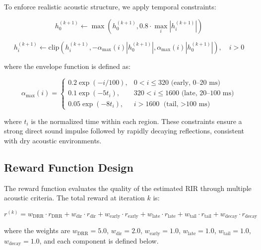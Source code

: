 To enforce realistic acoustic structure, we apply temporal constraints:

\begin{equation}
h_0^{(k+1)} \leftarrow \max(h_0^{(k+1)}, 0.8 \cdot \max_i |h_i^{(k+1)}|)
\label{eq:direct_constraint}
\end{equation}

\begin{equation}
h_i^{(k+1)} \leftarrow \text{clip}(h_i^{(k+1)}, -\alpha_{\text{max}}(i) |h_0^{(k+1)}|, \alpha_{\text{max}}(i) |h_0^{(k+1)}|), \quad i > 0
\label{eq:envelope_constraint}
\end{equation}

\noindent where the envelope function is defined as:

\begin{equation}
\alpha_{\text{max}}(i) = \begin{cases}
0.2 \exp(-i/100), & 0 < i \leq 320 \text{ (early, 0--20 ms)} \\
0.1 \exp(-5t_i), & 320 < i \leq 1600 \text{ (late, 20--100 ms)} \\
0.05 \exp(-8t_i), & i > 1600 \text{ (tail, $>$100 ms)}
\end{cases}
\label{eq:envelope_function}
\end{equation}

\noindent where $t_i$ is the normalized time within each region. These constraints ensure a strong direct sound impulse followed by rapidly decaying reflections, consistent with dry acoustic environments.

\subsection{Reward Function Design}
\label{subsec:reward}

The reward function evaluates the quality of the estimated RIR through multiple acoustic criteria. The total reward at iteration $k$ is:

\begin{equation}
r^{(k)} = w_\text{DRR} \cdot r_\text{DRR} + w_\text{dir} \cdot r_\text{dir} + w_\text{early} \cdot r_\text{early} + w_\text{late} \cdot r_\text{late} + w_\text{tail} \cdot r_\text{tail} + w_\text{decay} \cdot r_\text{decay}
\label{eq:total_reward}
\end{equation}

\noindent where the weights are $w_\text{DRR} = 5.0$, $w_\text{dir} = 2.0$, $w_\text{early} = 1.0$, $w_\text{late} = 1.0$, $w_\text{tail} = 1.0$, $w_\text{decay} = 1.0$, and each component is defined below.

